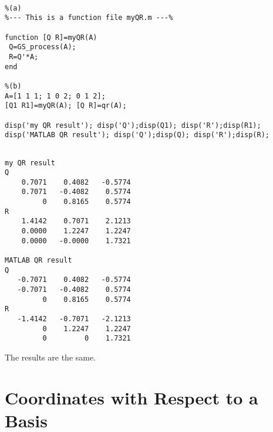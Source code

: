 \begin{sol}
\begin{verbatim}

%(a)
%--- This is a function file myQR.m ---%

function [Q R]=myQR(A)
 Q=GS_process(A);
 R=Q'*A;
end

%(b)
A=[1 1 1; 1 0 2; 0 1 2];
[Q1 R1]=myQR(A); [Q R]=qr(A);

disp('my QR result'); disp('Q');disp(Q1); disp('R');disp(R1);
disp('MATLAB QR result'); disp('Q');disp(Q); disp('R');disp(R);
\end{verbatim}

\begin{outputs}
\begin{verbatim}

my QR result
Q
    0.7071    0.4082   -0.5774
    0.7071   -0.4082    0.5774
         0    0.8165    0.5774
R
    1.4142    0.7071    2.1213
    0.0000    1.2247    1.2247
    0.0000   -0.0000    1.7321

MATLAB QR result
Q
   -0.7071    0.4082   -0.5774
   -0.7071   -0.4082    0.5774
         0    0.8165    0.5774
R
   -1.4142   -0.7071   -2.1213
         0    1.2247    1.2247
         0         0    1.7321
\end{verbatim}

\end{outputs}


\noindent The results are the same.
\end{sol}








\section{Coordinates with Respect to a Basis}

